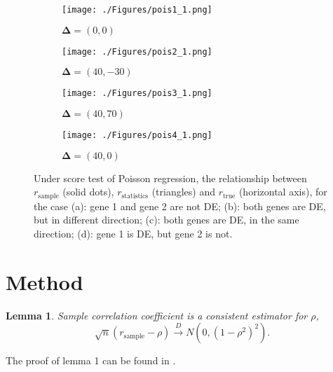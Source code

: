 \documentclass[12pt, a4paper]{article}
\newtheorem{lemma}{Lemma}
\begin{document}
	
	\begin{figure}[h!]
		\centering
		\begin{subfigure}{.5\textwidth}
			\centering
			\texttt{[image: ./Figures/pois1\_1.png]}
			\captionsetup{justification=centering}
			\caption{$\bm \Delta= (0, 0)$}
		\end{subfigure}%
		\begin{subfigure}{.5\textwidth}
			\centering
			\texttt{[image: ./Figures/pois2\_1.png]}
			\captionsetup{justification=centering}
			\caption{$\bm \Delta= (40, -30)$}
		\end{subfigure}
		\newline
		\newline
		\centering
		\begin{subfigure}{.5\textwidth}
			\centering
			\texttt{[image: ./Figures/pois3\_1.png]}
			\captionsetup{justification=centering}
			\caption{$\bm \Delta= (40, 70)$}
		\end{subfigure}%
		\begin{subfigure}{.5\textwidth}
			\centering
			\texttt{[image: ./Figures/pois4\_1.png]}
			\captionsetup{justification=centering}
			\caption{$\bm \Delta= (40, 0)$ }
		\end{subfigure}
		\caption{Under score test of Poisson regression, the relationship between $r_{\text{sample}}$
			(solid dots), $ r_\text{statistics}$ (triangles) and $r_{\text{true}}$ (horizontal axis), for the
			case (a): gene 1 and gene 2 are not DE; (b): both genes are DE, but in different direction; (c):
			both genes are DE, in the same direction; (d): gene 1 is DE, but gene 2 is not.}
		\label{figurePois}
	\end{figure}
	
	
	
	
	
	
	\section{Method}\label{section:testcormethod}
	
	\begin{lemma}
		Sample correlation coefficient is a consistent estimator for $\rho$, 
		\[\sqrt{n}(r_{\text{sample}} - \rho ) \stackrel{D}{\rightarrow}N\left(0, (1-\rho^2)^2\right).\]
	\end{lemma}
	The proof of lemma 1 can be found in \citet{fisher1915frequency}. \\
	
\end{document}
